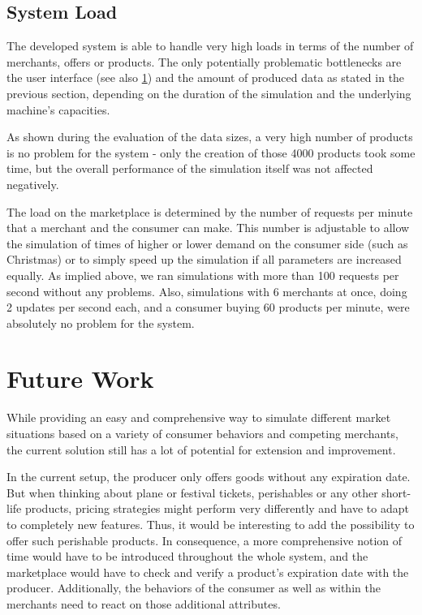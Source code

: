 \subsection{System Load}
\label{sec:system_evaluation}
%
The developed system is able to handle very high loads in terms of the number of merchants, offers or products. The only potentially problematic bottlenecks are the user interface (see also \cref{sec:FutureWork}) and the amount of produced data as stated in the previous section, depending on the duration of the simulation and the underlying machine's capacities. 

As shown during the evaluation of the data sizes, a very high number of products is no problem for the system - only the creation of those 4000 products took some time, but the overall performance of the simulation itself was not affected negatively. 

The load on the marketplace is determined by the number of requests per minute that a merchant and the consumer can make. This number is adjustable to allow the simulation of times of higher or lower demand on the consumer side (such as Christmas) or to simply speed up the simulation if all parameters are increased equally. As implied above, we ran simulations with more than 100 requests per second without any problems. Also, simulations with 6 merchants at once, doing 2 updates per second each, and a consumer buying 60 products per minute, were absolutely no problem for the system. 



\section{Future Work}
\label{sec:FutureWork}
%
While providing an easy and comprehensive way to simulate different market situations based on a variety of consumer behaviors and competing merchants, the current solution still has a lot of potential for extension and improvement. 

In the current setup, the producer only offers goods without any expiration date. But when thinking about plane or festival tickets, perishables or any other short-life products, pricing strategies might perform very differently and have to adapt to completely new features. Thus, it would be interesting to add the possibility to offer such perishable products. In consequence, a more comprehensive notion of time would have to be introduced throughout the whole system, and the marketplace would have to check and verify a product's expiration date with the producer. Additionally, the behaviors of the consumer as well as within the merchants need to react on those additional attributes.

